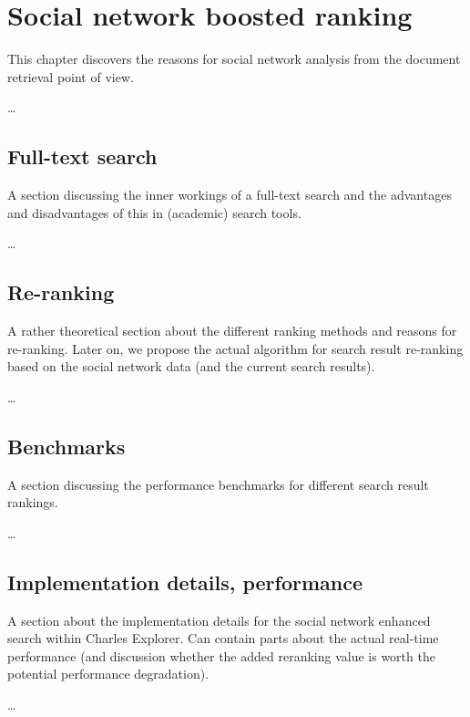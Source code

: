 \chapter{Social network boosted ranking}

This chapter discovers the reasons for social network analysis from the document retrieval point of view.

\dots

\section{Full-text search}

A section discussing the inner workings of a full-text search and the advantages and disadvantages of this in (academic) search tools.

\dots

\section{Re-ranking}

A rather theoretical section about the different ranking methods and reasons for re-ranking. Later on, we propose the actual algorithm for search result re-ranking based on the social network data (and the current search results). 

\dots

\section{Benchmarks}

A section discussing the performance benchmarks for different search result rankings.

\dots

\section{Implementation details, performance}

A section about the implementation details for the social network enhanced search within Charles Explorer. Can contain parts about the actual real-time performance (and discussion whether the added reranking value is worth the potential performance degradation).

\dots

